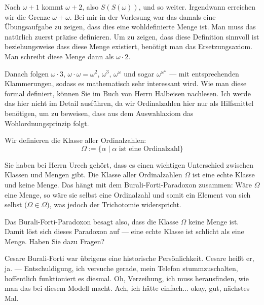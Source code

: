 \begin{spoken-clean}[00:42:58 - 00:44:23]
Nach $\omega + 1$ kommt $\omega + 2$, also $S(S(\omega))$, und so weiter. Irgendwann erreichen wir die Grenze $\omega + \omega$. Bei mir in der Vorlesung war das damals eine Übungsaufgabe zu zeigen, dass dies eine wohldefinierte Menge ist. Man muss das natürlich zuerst präzise definieren. Um zu zeigen, dass diese Definition sinnvoll ist beziehungsweise dass diese Menge existiert, benötigt man das Ersetzungsaxiom. Man schreibt diese Menge dann als $\omega \cdot 2$.

Danach folgen $\omega \cdot 3$, $\omega \cdot \omega = \omega^2$, $\omega^3$, $\omega^\omega$ und sogar $\omega^{\omega^\omega}$ --- mit entsprechenden Klammerungen, sodass es mathematisch sehr interessant wird. Wie man diese formal definiert, können Sie im Buch von Herrn Halbeisen nachlesen. Ich werde das hier nicht im Detail ausführen, da wir Ordinalzahlen hier nur als Hilfsmittel benötigen, um zu beweisen, dass aus dem Auswahlaxiom das Wohlordnungsprinzip folgt.
\end{spoken-clean}

\begin{math-stroke}
Wir definieren die Klasse aller Ordinalzahlen:
\[
\Omega := \{ \alpha \mid \alpha \text{ ist eine Ordinalzahl} \}
\]
\end{math-stroke}

\begin{spoken-clean}[00:44:23 - 00:45:48]
Sie haben bei Herrn Urech gehört, dass es einen wichtigen Unterschied zwischen Klassen und Mengen gibt. Die Klasse aller Ordinalzahlen $\Omega$ ist eine echte Klasse und keine Menge. Das hängt mit dem Burali-Forti-Paradoxon zusammen: Wäre $\Omega$ eine Menge, so wäre sie selbst eine Ordinalzahl und somit ein Element von sich selbst ($\Omega \in \Omega$), was jedoch der Trichotomie widerspricht.

Das Burali-Forti-Paradoxon besagt also, dass die Klasse $\Omega$ keine Menge ist. Damit löst sich dieses Paradoxon auf --- eine echte Klasse ist schlicht  als eine Menge. Haben Sie dazu Fragen?

Cesare Burali-Forti war übrigens eine historische Persönlichkeit. Cesare heißt er, ja. --- Entschuldigung, ich versuche gerade, mein Telefon stummzuschalten, hoffentlich funktioniert es diesmal. Oh, Verzeihung, ich muss herausfinden, wie man das bei diesem Modell macht. Ach, ich hätte einfach... okay, gut, nächstes Mal.
\end{spoken-clean}

